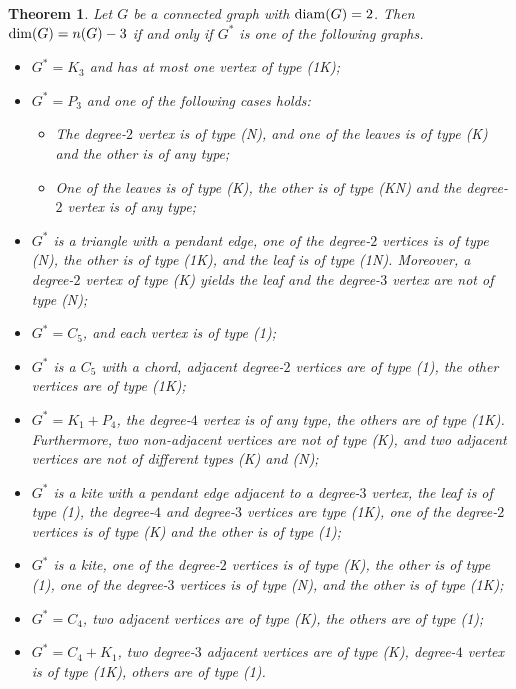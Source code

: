 \documentclass[12pt]{article}
\newtheorem{theorem}{Theorem}[section]
\DeclareMathOperator {\diam} {{\rm diam}}
\begin{document}
\begin{theorem} {\rm \cite[Theorem 1]{Jannesari}}
\label{Jannesari}
Let $G$ be a connected graph with $\diam(G) = 2$. Then ${\rm dim}(G)= n(G)-3$ if and only if $G^{\ast}$ is one of the following graphs.
\begin{itemize}
\item[{\bf G$_1$}.] 
$G^{\ast}= K_{3}$ and has at most one vertex of type (1K);
\item[{\bf G$_2$}.] 
$G^{\ast}= P_3$ and one of the following cases holds:
\begin{itemize}
\item[(a)] 
The degree-$2$ vertex is of type (N), and one of the leaves is of type (K) and the other is of any type;
\item[(b)] 
One of the leaves is of type (K), the other is of type (KN) and the degree-$2$ vertex is of any type;
\end{itemize}
\item[{\bf G$_3$}.] 
$G^{\ast}$ is a triangle with a pendant edge, one of the degree-$2$ vertices is of type (N), the other is of type (1K), and the leaf is of type (1N). Moreover, a degree-$2$ vertex of type (K) yields the leaf and the degree-$3$ vertex are not of type (N);
\item[{\bf G$_4$}.] 
$G^{\ast}= C_5$, and each vertex is of type (1);
\item[{\bf G$_5$}.] 
$G^{\ast}$ is a $C_5$ with a chord, adjacent degree-$2$ vertices are of type (1), the other
vertices are of type (1K);
\item[{\bf G$_6$}.] 
$G^{\ast}=K_1 + P_4$, the degree-$4$ vertex is of any type, the others are of type (1K). Furthermore, two non-adjacent vertices are not of type (K), and two adjacent
vertices are not of different types (K) and (N);
\item[{\bf G$_7$}.] 
$G^{\ast}$ is a kite with a pendant edge adjacent to a degree-$3$ vertex, the leaf is of type (1), the degree-$4$ and degree-$3$ vertices are type (1K), one of the degree-$2$ vertices is of type (K) and the other is of type (1);
\item[{\bf G$_8$}.] 
$G^{\ast}$ is a kite, one of the degree-$2$ vertices is of type (K), the other is of type (1), one of the degree-$3$ vertices is of type (N), and the other is of type (1K);
\item[{\bf G$_9$}.] 
$G^{\ast}= C_4$, two adjacent vertices are of type (K), the others are of type (1); 
\item[{\bf G$_{10}$}.] 
$G^{\ast}= C_4 + K_1$, two degree-$3$ adjacent vertices are of type (K), degree-$4$ vertex is of type (1K), others are of type (1).
\end{itemize}
\end{theorem} 
\end{document}
